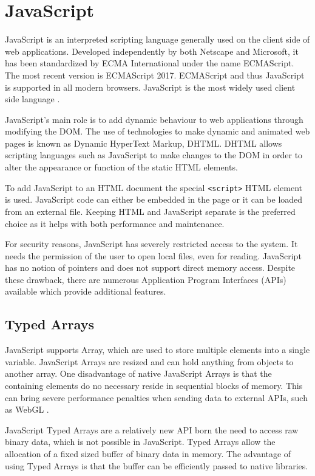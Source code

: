 \documentclass[10pt,a4paper,twoside]{book}
\begin{document}
\section{JavaScript}
\label{javascript}
JavaScript is an interpreted scripting language generally used on the client side of web applications. Developed independently by both Netscape and Microsoft, it has been standardized by ECMA International under the name ECMAScript.
The most recent version is ECMAScript 2017. ECMAScript and thus JavaScript is supported in all modern browsers. JavaScript is the most widely used client side language \cite{javascriptstats, javascriptabout}.

JavaScript's main role is to add dynamic behaviour to web applications through modifying the DOM. The use of technologies to make dynamic and animated web pages is known as Dynamic HyperText Markup, DHTML. DHTML allows scripting languages such as JavaScript to make changes to the DOM in order to alter the appearance or function of the static HTML elements.

To add JavaScript to an HTML document the special \texttt{<script>} HTML element is used. JavaScript code can either be embedded in the page or it can be loaded from an external file. Keeping HTML and JavaScript separate is the preferred choice as it helps with both performance and maintenance.

For security reasons, JavaScript has severely restricted access to the system. It needs the permission of the user to open local files, even for reading. JavaScript has no notion of pointers and does not support direct memory access. Despite these drawback, there are numerous Application Program Interfaces (APIs) available which provide additional features.

\subsection{Typed Arrays}

JavaScript supports Array, which are used to store multiple elements into a single variable. JavaScript Arrays are  resized and can hold anything from objects to another array. One disadvantage of native JavaScript Arrays is that the containing elements do no necessary reside in sequential blocks of memory. This can bring severe performance penalties when sending data to external APIs, such as WebGL \cite{webgl}.

JavaScript Typed Arrays \cite{typedarrays} are a relatively new API born the need to access raw binary data, which is not possible in JavaScript. Typed Arrays allow the allocation of a fixed sized buffer of binary data in memory. The advantage of using Typed Arrays is that the buffer can be efficiently passed to native libraries.
\end{document}
